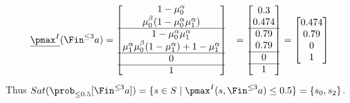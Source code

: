 \begin{align*}
	\underline{\pmax^I}(\Fin^{\le 3} a)
	 & = \begin{bmatrix}
		     1 - \mu_0^\alpha                                         \\
		     \mu_0^\beta(1 - \mu_0^\alpha \mu_1^\alpha)               \\
		     \hline
		     1- \mu_0^\alpha\mu_1^\alpha                              \\
		     \mu_1^\alpha\mu_0^\beta(1-\mu_1^\alpha) + 1-\mu_1^\alpha \\
		     \hline
		     0                                                        \\
		     \hline
		     1                                                        \\
	     \end{bmatrix}
	 & = \begin{bmatrix}
		     0.3   \\
		     0.474 \\
		     \hline
		     0.79  \\
		     0.79  \\
		     \hline
		     0     \\
		     \hline
		     1     \\
	     \end{bmatrix}
	= \begin{bmatrix}
		  0.474 \\
		  0.79  \\
		  0     \\
		  1     \\
	  \end{bmatrix}
\end{align*}
Thus $Sat(\prob_{\le 0.5}[\Fin^{\le 3} a]) = \{ s \in S \mid \pmax^I(s, \Fin^{\le 3} a) \le 0.5 \} = \{ s_0, s_2 \}$.

\subsubsection{}

